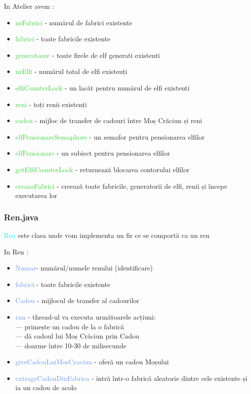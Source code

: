 \documentclass{article}
\begin{document}
In Atelier avem :
\begin{itemize}
\item  \textcolor{LimeGreen}{nrFabrici} - numărul de fabrici existente
\item \textcolor{LimeGreen}{fabrici} - toate fabricile existente
\item \textcolor{LimeGreen}{generatoare} - toate firele de elf generati existenti
\item \textcolor{LimeGreen}{nrElfi} - numărul total de elfi existenți
\item \textcolor{LimeGreen}{elfiCounterLock} - un lacăt pentru numărul de elfi existenti
\item \textcolor{LimeGreen}{reni} - toți renii existenți
\item \textcolor{LimeGreen}{cadou} - mijloc de transfer de cadouri între Moș Crăciun și reni
\item \textcolor{LimeGreen}{elfPensionareSemaphore} - un semafor pentru pensionarea elfilor
\item \textcolor{LimeGreen}{elfPensionare} - un subiect pentru pensionarea elfilor
\item \textcolor{LimeGreen}{getElfiCounterLock} - returnează blocarea contorului elfilor
\item \textcolor{LimeGreen}{creazaFabrici} - creează toate fabricile, generatorii de elfi, renii și începe executarea lor
\end{itemize}


\subsubsection{\textcolor{Periwinkle}{Ren.java}}
\textcolor{Cyan}{Ren} este clasa unde vom implementa un fir ce se comportă ca un ren

In Ren :
\begin{itemize}
\item  \textcolor{CornflowerBlue}{Numar}- numărul/numele renului (identificare)
\item \textcolor{CornflowerBlue}{fabrici} - toate fabricile existente
\item \textcolor{CornflowerBlue}{Cadou} - mijlocul de transfer al cadourilor
\item \textcolor{CornflowerBlue}{run} - thread-ul va executa următoarele acțiuni:\\
--- primește un cadou de la o fabrică\\
--- dă cadoul lui Moș Crăciun prin Cadou\\
--- doarme între 10-30 de milisecunde
\item \textcolor{CornflowerBlue}{giveCadouLuiMosCraciun} - oferă un cadou Moșului
\item \textcolor{CornflowerBlue}{extrageCadouDinFabrica} - intră într-o fabrică aleatorie dintre cele existente și ia un cadou de acolo
\end{itemize}
\end{document}
